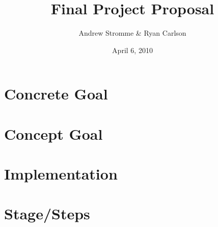 \documentclass{article}
\begin{document}
\title{Final Project Proposal}
\author{Andrew Stromme \& Ryan Carlson}
\date{April 6, 2010}
\maketitle

\section{Concrete Goal}

\section{Concept Goal}

\section{Implementation}

\section{Stage/Steps}
\end{document}
